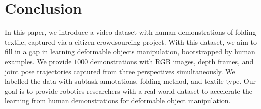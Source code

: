 \documentclass[\home/main.tex]{subfiles}
\begin{document}
\section{Conclusion}

In this paper, we introduce a video dataset with human demonstrations of folding textile, captured via a citizen crowdsourcing project. With this dataset, we aim to fill in a gap in learning deformable objects manipulation, bootstrapped by human examples. We provide $1000$ demonstrations with RGB images, depth frames, and joint pose trajectories captured from three perspectives simultaneously. We labelled the data with subtask annotations, folding method, and textile type. Our goal is to provide robotics researchers with a real-world dataset to accelerate the learning from human demonstrations for deformable object manipulation.
\end{document}
